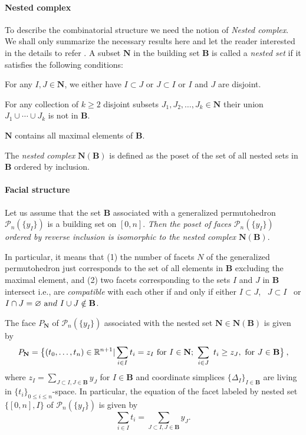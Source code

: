 \documentclass[hidelinks,12pt]{article}
\newcommand{\bea}[1]{\begin{eqnarray}\label{#1} }
\newcommand{\eea}{\end{eqnarray}}
\def\bea{\begin{eqnarray}}
\def\eea{\end{eqnarray}}
\begin{document}
\paragraph{Nested complex} To describe the combinatorial structure we need the notion of {\it Nested complex}. We shall only summarize the necessary results here and let the reader interested in the details to refer \cite{Postnikov:2005,Postnikov:2006}.
A subset ${\mathbf N}$ in the building set ${\mathbf B}$ is called a {\it nested set} if it satisfies the following conditions:
\begin{compactenum}[\quad (1)]
    \item For any $I,J \in {\mathbf N}$, we either have $I \subset J$ or $J\subset I$ or $I$ and $J$ are disjoint.
    \item For any collection of $k \geq 2$ disjoint subsets $J_1,J_2,\dots, J_k \in \mathbf N$ their union $J_1 \cup \cdots \cup J_k$ is not in $\mathbf B$.
    \item ${\mathbf N}$ contains all maximal elements of $\mathbf B$.
\end{compactenum}
The {\it nested complex} ${\mathbf N}({\mathbf B})$ is defined as the poset of the set of all nested sets in ${\mathbf B}$ ordered by inclusion.
\paragraph*{Facial structure} 
Let us assume that the set ${\mathbf B}$ associated with a generalized permutohedron ${\mathscr P_n(\{y_I\})}$ is a building set on $[0,n]$. \emph{Then the poset of faces ${\mathscr P_n(\{y_I\})}$ ordered by reverse inclusion is isomorphic to the nested complex ${\mathbf N}({\mathbf B})$}. 

In particular, it means that (1) the number of facets $N$ of the generalized permutohedron just corresponds to the set of all elements in ${\mathbf B}$ excluding the maximal element, and (2) two facets corresponding to the sets $I$ and $J$ in ${\mathbf B}$ intersect i.e., are {\it compatible} with each other if and only if  either $I \subset J$,~ $J \subset I$~ or $I \cap J = \varnothing ~{\text and} ~ I \cup J \notin {\mathbf B}$.

The face $P_\mathbf{N}$ of ${\mathscr P_n(\{y_I\})}$ associated with the nested set $\mathbf{N} \in \mathbf{N}(\mathbf{B})$ is given by
\bea\label{deffacet}
P_{\mathbf{N}} = \bigl\{ (t_0,\dots,t_{n}) \in \mathbb{R}^{n+1} | \sum_{i \in I} t_i =z_{I}~{\rm for}~I \in \mathbf{N}; ~ \sum_{i \in J}~t_i \geq z_J,~ {\rm for} ~J \in \mathbf{B}  \bigr\} \:,
\eea
where $z_I=\sum_{J\subset I,J\in\mathbf B}y_J$ for $I\in \mathbf B$ and coordinate simplices $\{\Delta_I\}_{I\in\mathbf B}$ are living in $\{t_i\}_{0\leq i\leq n}$-space.
In particular, the equation of the facet labeled by nested set $\{[0,n],I\}$ of ${\mathscr P_n(\{y_I\})}$ is given by
\begin{equation}\label{eqoffacet}
\sum_{i\in I}t_i=\sum_{J\subset I,J\in\mathbf B}y_J.
\end{equation}
\end{document}
